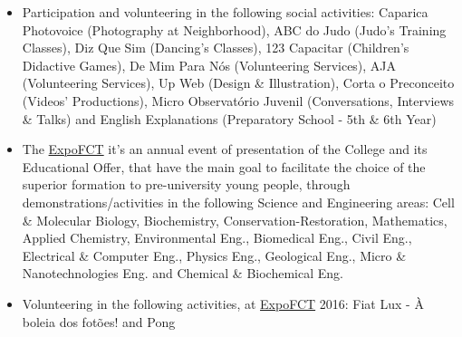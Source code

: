 \documentclass[10pt,a4paper,academicons]{altacv}
\begin{document}
\divider

\clearpage


\begin{itemize}
\item Participation and volunteering in the following social activities: Caparica Photovoice (Photography at Neighborhood), ABC do Judo (Judo's Training Classes), Diz Que Sim (Dancing's Classes), 123 Capacitar (Children's Didactive Games), De Mim Para Nós (Volunteering Services), AJA (Volunteering Services), Up Web (Design \& Illustration), Corta o Preconceito (Videos' Productions), Micro Observatório Juvenil (Conversations, Interviews \& Talks) and English Explanations (Preparatory School - 5th \& 6th Year)
\end{itemize}

\divider

\begin{itemize}
\item The \href{https://www.expo.fct.unl.pt/}{ExpoFCT} it's an annual event of presentation of the College and its Educational Offer, that have the main goal to facilitate the choice of the superior formation to pre-university young people, through demonstrations/activities in the following Science and Engineering areas: Cell \& Molecular Biology, Biochemistry, Conservation-Restoration, Mathematics, Applied Chemistry, Environmental Eng., Biomedical Eng., Civil Eng., Electrical \& Computer Eng., Physics Eng., Geological Eng., Micro \& Nanotechnologies Eng. and Chemical \& Biochemical Eng.
\item Volunteering in the following activities, at \href{https://www.expo.fct.unl.pt/}{ExpoFCT} 2016: Fiat Lux - À boleia dos fotões! and Pong
\end{itemize}
\end{document}
